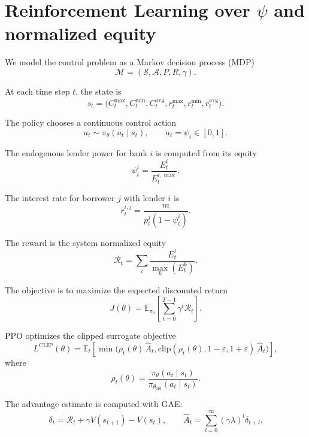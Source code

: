 \documentclass{article}
\begin{document}
\pagestyle{empty}

\section*{Reinforcement Learning over $\psi$ and normalized equity}

We model the control problem as a Markov decision process (MDP)
\[
\mathcal{M} = (\mathcal{S}, \mathcal{A}, P, R, \gamma).
\]

At each time step $t$, the state is
\[
s_t = \big(C^{\max}_t, C^{\min}_t, C^{\mathrm{avg}}_t, r^{\max}_t, r^{\min}_t, r^{\mathrm{avg}}_t\big).
\]

The policy chooses a continuous control action
\[
a_t \sim \pi_\theta(a_t \mid s_t), \qquad a_t = \psi_t \in [0,1].
\]

The endogenous lender power for bank $i$ is computed from its equity
\[
\psi_t^i = \frac{E_t^i}{E_t^{i,\max}}.
\]

The interest rate for borrower $j$ with lender $i$ is
\[
r_t^{i,j} = \frac{m}{p_t^j (1 - \psi_t^i)}.
\]

The reward is the system normalized equity
\[
\mathcal{R}_t = \sum_i \frac{E_t^i}{\max_k(E_t^k)}.
\]

The objective is to maximize the expected discounted return
\[
J(\theta) = \mathbb{E}_{\pi_\theta}\left[ \sum_{t=0}^{T-1} \gamma^t \mathcal{R}_t \right].
\]

PPO optimizes the clipped surrogate objective
\[
L^{\mathrm{CLIP}}(\theta) =
\mathbb{E}_t\left[
\min\big(
\rho_t(\theta)\,\hat{A}_t,
\mathrm{clip}(\rho_t(\theta), 1-\varepsilon, 1+\varepsilon)\,\hat{A}_t
\big)
\right],
\]
where
\[
\rho_t(\theta) = \frac{\pi_\theta(a_t\mid s_t)}{\pi_{\theta_{\mathrm{old}}}(a_t\mid s_t)}.
\]

The advantage estimate is computed with GAE:
\[
\delta_t = \mathcal{R}_t + \gamma V(s_{t+1}) - V(s_t),
\qquad
\hat{A}_t = \sum_{l=0}^{\infty} (\gamma \lambda)^l \delta_{t+l}.
\]
\end{document}
